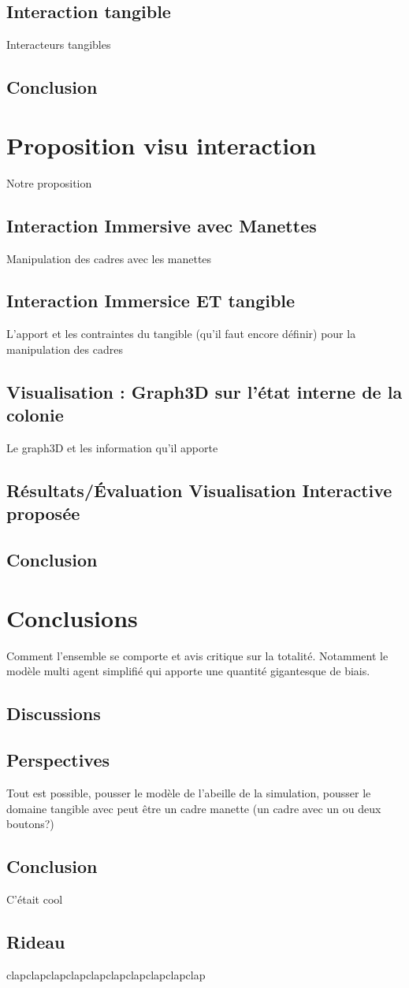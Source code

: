 \documentclass[11pt,a4paper]{report}
\begin{document}
	\section{Interaction tangible}
		Interacteurs tangibles
		
			
	\section*{Conclusion}
		
		
		
		
\chapter{Proposition visu interaction}
	Notre proposition
	\section{Interaction Immersive avec Manettes}
		Manipulation des cadres avec les manettes
	\section{Interaction Immersice ET tangible}
		L'apport et les contraintes du tangible (qu'il faut encore définir) pour la manipulation des cadres
	\section{Visualisation : Graph3D sur l'état interne de la colonie}
		Le graph3D et les information qu'il apporte
	\section{Résultats/Évaluation Visualisation Interactive proposée}
	
			
	\section*{Conclusion}
	
	
	
	
\chapter{Conclusions}
	Comment l'ensemble se comporte et avis critique sur la totalité. Notamment le modèle multi agent simplifié qui apporte une quantité gigantesque de biais.
\section{Discussions}
	
\section{Perspectives}
	Tout est possible, pousser le modèle de l'abeille de la simulation, pousser le domaine tangible avec peut être un cadre manette (un cadre avec un ou deux boutons?)
\section{Conclusion}
	C'était cool
\section*{Rideau}
	clapclapclapclapclapclapclapclapclapclap
\end{document}

